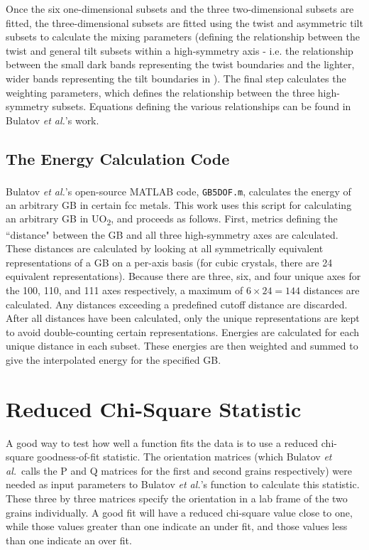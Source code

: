 \documentclass[twoside,senior]{BYUPhys}
\begin{document}
Once the six one-dimensional subsets and the three two-dimensional subsets are fitted, the three-dimensional subsets are fitted using the twist and asymmetric tilt subsets to calculate the mixing parameters (defining the relationship between the twist and general tilt subsets within a high-symmetry axis - i.e. the relationship between the small dark bands representing the twist boundaries and the lighter, wider bands representing the tilt boundaries in ).  The final step calculates the weighting parameters, which defines the relationship between the three high-symmetry subsets.  Equations defining the various relationships can be found in Bulatov \emph{et al.}'s work.\cite{bulatov2014}

\subsection{The Energy Calculation Code\label{code:energyCalc}}
Bulatov \emph{et al.}'s open-source MATLAB\textsuperscript{\textregistered} code\cite{bulatov2014}, \lstinline!GB5DOF.m!, calculates the energy of an arbitrary GB in certain fcc metals. This work uses this script for calculating an arbitrary GB in UO\textsubscript{2}, and proceeds as follows.  First, metrics defining the ``distance" between the GB and all three high-symmetry axes are calculated.  These distances are calculated by looking at all symmetrically equivalent representations of a GB on a per-axis basis (for cubic crystals, there are 24 equivalent representations\cite{stokes2007}).  Because there are three, six, and four unique axes for the \textlangle{}100\textrangle{}, \textlangle{}110\textrangle{}, and \textlangle{}111\textrangle{} axes respectively, a maximum of $6\times24=144$ distances are calculated.  Any distances exceeding a predefined cutoff distance are discarded.  After all distances have been calculated, only the unique representations are kept to avoid double-counting certain representations.\cite{bulatov2014}  Energies are calculated for each unique distance in each subset.  These energies are then weighted and summed to give the interpolated energy for the specified GB.

\section{Reduced Chi-Square Statistic\label{methods:chi2}}
A good way to test how well a function fits the data is to use a reduced chi-square goodness-of-fit statistic.\cite{bevington2003}  The orientation matrices (which Bulatov \emph{et al.}\ calls the P and Q matrices for the first and second grains respectively) were needed as input parameters to Bulatov \emph{et al.}'s function to calculate this statistic.  These three by three matrices specify the orientation in a lab frame of the two grains individually. A good fit will have a reduced chi-square value close to one, while those values greater than one indicate an under fit, and those values less than one indicate an over fit.\cite{bevington2003}
\end{document}
